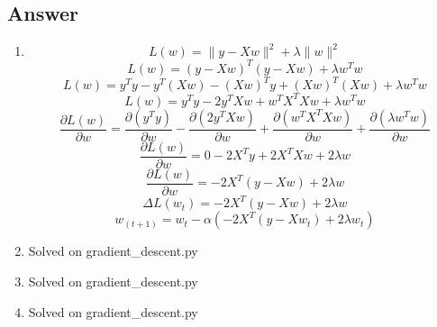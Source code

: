 \documentclass[conference, onecolumn]{IEEEtran}
\begin{document}
	\subsection*{Answer}
	\begin{enumerate}
		\item[(a)] \begin{equation}
			L(w) = \|y - Xw\|^2 + \lambda \|w\|^2
		\end{equation}
		\begin{equation}
			L(w) = (y - Xw)^T (y - Xw) + \lambda w^T w
		\end{equation}
		\begin{equation}
			L(w) = y^T y - y^T (Xw) - (Xw)^T y + (Xw)^T (Xw) + \lambda w^T w
		\end{equation}
		\begin{equation}
			L(w) = y^T y - 2y^T X w + w^T X^T X w + \lambda w^T w
		\end{equation}
		\begin{equation}
			\frac{\partial L(w)}{\partial w} = \frac{\partial (y^T y)}{\partial w} - \frac{\partial (2y^T X w)}{\partial w} + \frac{\partial (w^T X^T X w)}{\partial w} + \frac{\partial (\lambda w^T w)}{\partial w}
		\end{equation}
		\begin{equation}
			\frac{\partial L(w)}{\partial w} = 0 - 2X^T y + 2X^T X w + 2\lambda w
		\end{equation}
		\begin{equation}
			\frac{\partial L(w)}{\partial w} = -2X^T (y - Xw) + 2\lambda w
		\end{equation}
		\begin{equation}
			\Delta L(w_t) = -2X^T (y - Xw) + 2\lambda w
		\end{equation}
		\begin{equation}
			w_{(t+1)} = w_t - \alpha (-2X^T (y - X w_t) + 2\lambda w_t)
		\end{equation}
		\item[(b)] Solved on gradient\_descent.py
		\item[(c)] Solved on gradient\_descent.py
		\item[(d)] Solved on gradient\_descent.py
	\end{enumerate}
	
	
\end{document}
